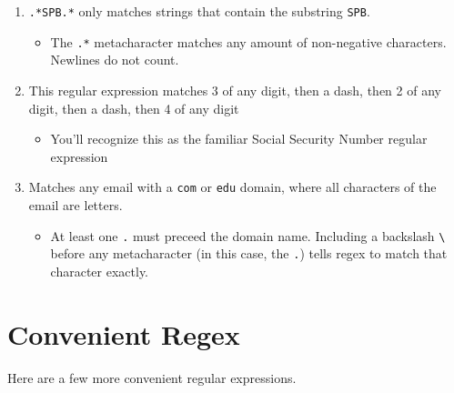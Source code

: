\documentclass[
  letterpaper,
  DIV=11,
  numbers=noendperiod]{scrreprt}
\providecommand{\tightlist}{%
  \setlength{\itemsep}{0pt}\setlength{\parskip}{0pt}}\usepackage{longtable,booktabs,array}
\begin{document}
\begin{enumerate}
\def\labelenumi{\arabic{enumi}.}
\tightlist
\item
  \texttt{.*SPB.*} only matches strings that contain the substring
  \texttt{SPB}.

  \begin{itemize}
  \tightlist
  \item
    The \texttt{.*} metacharacter matches any amount of non-negative
    characters. Newlines do not count.\\
  \end{itemize}
\item
  This regular expression matches 3 of any digit, then a dash, then 2 of
  any digit, then a dash, then 4 of any digit

  \begin{itemize}
  \tightlist
  \item
    You'll recognize this as the familiar Social Security Number regular
    expression
  \end{itemize}
\item
  Matches any email with a \texttt{com} or \texttt{edu} domain, where
  all characters of the email are letters.

  \begin{itemize}
  \tightlist
  \item
    At least one \texttt{.} must preceed the domain name. Including a
    backslash \texttt{\textbackslash{}} before any metacharacter (in
    this case, the \texttt{.}) tells regex to match that character
    exactly.
  \end{itemize}
\end{enumerate}

\hypertarget{convenient-regex}{%
\section{Convenient Regex}\label{convenient-regex}}

Here are a few more convenient regular expressions.
\end{document}

